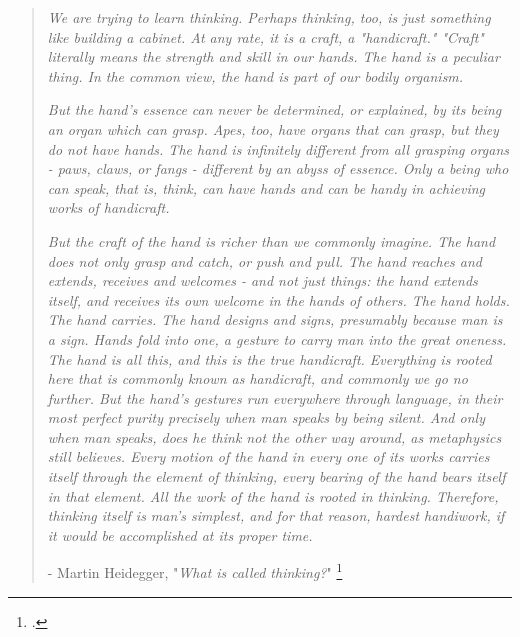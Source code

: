\begin{quotation}
\textit{We are trying to learn thinking. Perhaps thinking, too, is just something like building a cabinet. At any rate, it is a craft, a "handicraft." "Craft" literally means the strength and skill in our hands. The hand is a peculiar thing. In the common view, the hand is part of our bodily organism.}

\textit{But the hand's essence can never be determined, or explained, by its being an organ which can grasp. Apes, too, have organs that can grasp, but they do not have hands. The hand is infinitely different from all grasping organs - paws, claws, or fangs - different by an abyss of essence. Only a being who can speak, that is, think, can have hands and can be handy in achieving works of handicraft. }

\textit{But the craft of the hand is richer than we commonly imagine. The hand does not only grasp and catch, or push and pull. The hand reaches and extends, receives and welcomes - and not just things: the hand extends itself, and receives its own welcome in the hands of others. The hand holds. The hand carries. The hand designs and signs, presumably because man is a sign. Hands fold into one, a gesture to carry man into the great oneness. The hand is all this, and this is the true handicraft. Everything is rooted here that is commonly known as handicraft, and commonly we go no further. But the hand's gestures run everywhere through language, in their most perfect purity precisely when man speaks by being silent. And only when man speaks, does he think not the other way around, as metaphysics still believes. Every motion of the hand in every one of its works carries itself through the element of thinking, every bearing of the hand bears itself in that element. All the work of the hand is rooted in thinking. Therefore, thinking itself is man's simplest, and for that reason, hardest handiwork, if it would be accomplished at its proper time.}
\\

\begin{flushright}
- Martin Heidegger, "\textit{What is called thinking?}" \footcite{Heidegger1968}
\end{flushright}
\end{quotation}